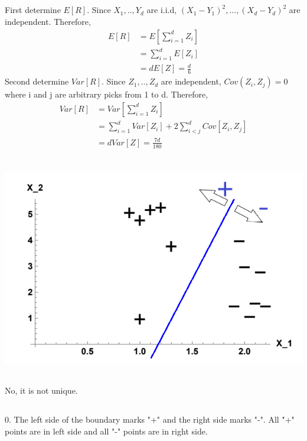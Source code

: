 \documentclass{article}
\begin{document}
\subsection{}
First determine $E[R]$. Since $X_1,..,Y_d$ are i.i.d, $(X_1-Y_1)^2,...,(X_d-Y_d)^2$ are independent. Therefore,
\begin{align*}
    E[R] &= E[\sum_{i = 1}^{d}Z_i]\\
    &= \sum_{i = 1}^{d}E[Z_i]\\
    &= dE[Z] = \frac{d}{6}
\end{align*}
Second determine $Var[R]$. Since $Z_1,..,Z_d$ are independent, $Cov(Z_i,Z_j)=0$ where i and j are arbitrary picks from 1 to d. Therefore,
\begin{align*}
    Var[R] &= Var[\sum_{i = 1}^{d}Z_i]\\
    &= \sum_{i = 1}^{d}Var[Z_i] + 2\sum_{i<j}^{d}Cov[Z_i,Z_j]\\
    &= dVar[Z] = \frac{7d}{180}
\end{align*}
\section{}
\subsection{}
\includegraphics{2a.png}
\subsection{}
No, it is not unique.
\subsection{}
0. The left side of the boundary marks "+" and the right side marks "-". All "+" points are in left side and all "-" points are in right side.
\end{document}

